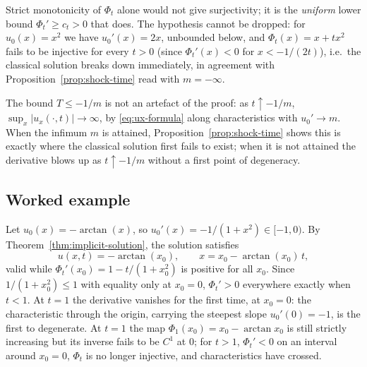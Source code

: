 \begin{remark}
\label{rem:hypothesis-u0prime}
Strict monotonicity of $\Phi_t$ alone would not give surjectivity; it is
the \emph{uniform} lower bound $\Phi_t'\ge c_t>0$ that does. The
hypothesis cannot be dropped: for $u_0(x)=x^2$ we have $u_0'(x)=2x$,
unbounded below, and $\Phi_t(x)=x+tx^2$ fails to be injective for every
$t>0$ (since $\Phi_t'(x)<0$ for $x<-1/(2t)$), i.e.\ the classical
solution breaks down immediately, in agreement with
Proposition~\ref{prop:shock-time} read with $m=-\infty$.
\end{remark}

The bound $T \leq -1/m$ is not an artefact of the proof: as $t\uparrow-1/m$,
$\sup_x|u_x(\cdot,t)|\to\infty$, by \eqref{eq:ux-formula} along
characteristics with $u_0'\to m$. When the infimum $m$ is attained,
Proposition~\ref{prop:shock-time} shows this is exactly where the classical
solution first fails to exist; when it is not attained the derivative blows
up as $t\uparrow-1/m$ without a first point of degeneracy.

\subsection{Worked example}
\label{subsec:char-example}

Let $u_0(x) = -\arctan(x)$, so $u_0'(x) = -1/(1+x^2) \in [-1,0)$. By
Theorem~\ref{thm:implicit-solution}, the solution satisfies
\begin{equation}
  u(x,t) = -\arctan(x_0), \qquad x = x_0 - \arctan(x_0)\, t,
\end{equation}
valid while $\Phi_t'(x_0) = 1 - t/(1+x_0^2)$ is positive for all $x_0$.
Since $1/(1+x_0^2)\le 1$ with equality only at $x_0=0$, $\Phi_t'>0$
everywhere exactly when $t<1$. At $t=1$ the derivative vanishes for the
first time, at $x_0=0$: the characteristic through the origin, carrying
the steepest slope $u_0'(0)=-1$, is the first to degenerate. At $t=1$ the
map $\Phi_1(x_0)=x_0-\arctan x_0$ is still strictly increasing but its
inverse fails to be $C^1$ at $0$; for $t>1$, $\Phi_t'<0$ on an interval
around $x_0=0$, $\Phi_t$ is no longer injective, and characteristics have
crossed.

